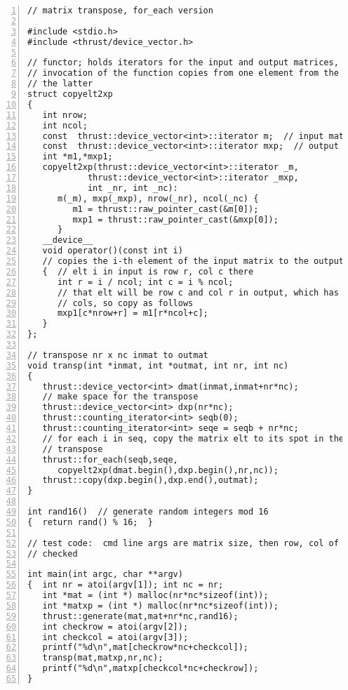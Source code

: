 \begin{lstlisting}[numbers=left]
// matrix transpose, for_each version

#include <stdio.h>
#include <thrust/device_vector.h>

// functor; holds iterators for the input and output matrices, and each
// invocation of the function copies from one element from the former to
// the latter
struct copyelt2xp  
{
   int nrow;  
   int ncol;  
   const  thrust::device_vector<int>::iterator m;  // input matrix 
   const  thrust::device_vector<int>::iterator mxp;  // output matrix
   int *m1,*mxp1;
   copyelt2xp(thrust::device_vector<int>::iterator _m, 
            thrust::device_vector<int>::iterator _mxp, 
            int _nr, int _nc): 
      m(_m), mxp(_mxp), nrow(_nr), ncol(_nc) {
         m1 = thrust::raw_pointer_cast(&m[0]);
         mxp1 = thrust::raw_pointer_cast(&mxp[0]);
      }
   __device__
   void operator()(const int i)  
   // copies the i-th element of the input matrix to the output matrix
   {  // elt i in input is row r, col c there
      int r = i / ncol; int c = i % ncol;  
      // that elt will be row c and col r in output, which has nrow
      // cols, so copy as follows
      mxp1[c*nrow+r] = m1[r*ncol+c];
   }
};

// transpose nr x nc inmat to outmat
void transp(int *inmat, int *outmat, int nr, int nc)
{
   thrust::device_vector<int> dmat(inmat,inmat+nr*nc);
   // make space for the transpose
   thrust::device_vector<int> dxp(nr*nc);
   thrust::counting_iterator<int> seqb(0);
   thrust::counting_iterator<int> seqe = seqb + nr*nc;
   // for each i in seq, copy the matrix elt to its spot in the
   // transpose
   thrust::for_each(seqb,seqe,
      copyelt2xp(dmat.begin(),dxp.begin(),nr,nc));
   thrust::copy(dxp.begin(),dxp.end(),outmat);
}

int rand16()  // generate random integers mod 16
{  return rand() % 16;  }

// test code:  cmd line args are matrix size, then row, col of elt to be
// checked

int main(int argc, char **argv)
{  int nr = atoi(argv[1]); int nc = nr;
   int *mat = (int *) malloc(nr*nc*sizeof(int));
   int *matxp = (int *) malloc(nr*nc*sizeof(int));
   thrust::generate(mat,mat+nr*nc,rand16);
   int checkrow = atoi(argv[2]);
   int checkcol = atoi(argv[3]);
   printf("%d\n",mat[checkrow*nc+checkcol]);
   transp(mat,matxp,nr,nc);
   printf("%d\n",matxp[checkcol*nc+checkrow]);
}
\end{lstlisting}

